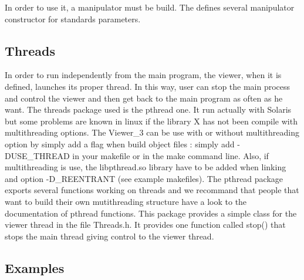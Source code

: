 
In order to use it, a manipulator must be build. The
 defines several manipulator constructor for
standards parameters.

\ccGlue
\ccGlue
\ccGlue
{}
\ccGlue
{}



\subsection{Threads}

In order to run independently from the main program, the viewer, when
it is defined, launches its proper thread. In this way, user can stop
the main process and control the viewer and then get back to the main
program as often as he want. 
The threads package used is the pthread one. It run actually with
Solaris but some problems are known in linux if the library X has not 
been compile with multithreading options. The Viewer\_3 can be use with 
or without multithreading option by simply add a flag when build
object files : simply add -DUSE\_THREAD in your makefile or in the make 
command line. Also, if multithreading is use, the libpthread.so library
have to be added when linking and option -D\_REENTRANT (see example
makefiles).
The pthread package exports several functions working on threads and
we recommand that people that want to build their own mutithreading
structure have a look to the documentation of pthread functions. This
package provides a simple class for the viewer thread in the file
Threads.h. It provides one function called stop() that stops the main
thread giving control to the viewer thread.

\subsection{Examples}

